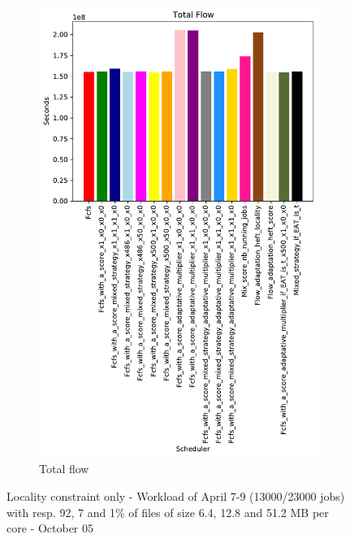 \documentclass[a4paper]{article}
\begin{document}
\begin{figure}[H]
\begin{subfigure}[b]{0.4\linewidth}\centering\includegraphics[width=0.9\linewidth]{MBSS/plot/Results_FCFS_Score_Adaptative_Multiplier_2022-04-07->2022-04-09_V9271_Total_flow_450_128_32_256_4_1024.pdf}\caption{Total flow}\end{subfigure}
\caption{Locality constraint only - Workload of April 7-9 (13000/23000 jobs) with resp. 92, 7 and 1\% of files of size 6.4, 12.8 and 51.2 MB per core - October 05}\end{figure}
\end{document}
